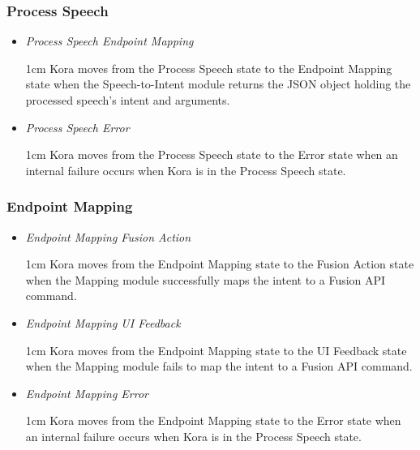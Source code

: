 \documentclass[onecolumn, draftclsnofoot,10pt, compsoc]{IEEEtran}
\def \botname{Kora\xspace}
\newenvironment{indentItem}[1][1cm]{\begin{adjustwidth}{#1}{}}{\end{adjustwidth}}
\begin{document}
		\subsubsection{Process Speech}
		\begin{itemize}
			\item \textit{Process Speech \textrightarrow{} Endpoint Mapping}
			\begin{indentItem}
				\botname moves from the Process Speech state to the Endpoint Mapping state when the Speech-to-Intent module returns the JSON object holding the processed speech's intent and arguments.
			\end{indentItem}
			\item \textit{Process Speech \textrightarrow{} Error}
			\begin{indentItem}
				\botname moves from the Process Speech state to the Error state when an internal failure occurs when \botname is in the Process Speech state.
			\end{indentItem}
		\end{itemize}
		
		\subsubsection{Endpoint Mapping}
		\begin{itemize}
			\item \textit{Endpoint Mapping \textrightarrow{} Fusion Action}
			\begin{indentItem}
				\botname moves from the Endpoint Mapping state to the Fusion Action state when the Mapping module successfully maps the intent to a Fusion API command.
			\end{indentItem}
			\item \textit{Endpoint Mapping \textrightarrow{} UI Feedback}
			\begin{indentItem}
				\botname moves from the Endpoint Mapping state to the UI Feedback state when the Mapping module fails to map the intent to a Fusion API command.
			\end{indentItem}
			\item \textit{Endpoint Mapping \textrightarrow{} Error}
			\begin{indentItem}
				\botname moves from the Endpoint Mapping state to the Error state when an internal failure occurs when \botname is in the Process Speech state.
			\end{indentItem}
		\end{itemize}
		
\end{document}
